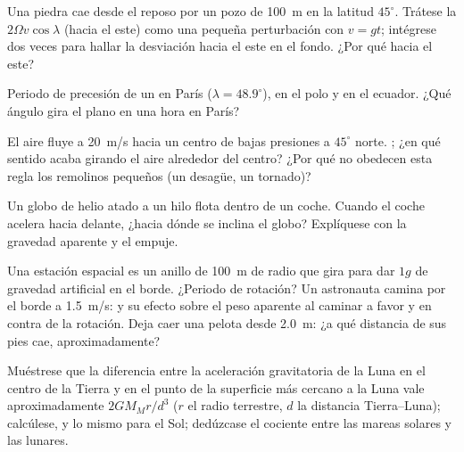 \begin{exercise}[$\star\star$]\label{exo:b1:non-inertial-frames:7}
Una piedra cae desde el reposo por un pozo de \qty{100}{m} en la latitud
$45^\circ$. Trátese la  $2\Omega v\cos\lambda$ (hacia
el este) como una pequeña perturbación con $v = gt$; intégrese dos veces
para hallar la desviación hacia el este en el fondo. ¿Por qué hacia el este?
\end{exercise}

\begin{exercise}[$\star\star$]\label{exo:b1:non-inertial-frames:8}
Periodo de precesión de un  en París ($\lambda = 48.9^\circ$),
en el polo y en el ecuador. ¿Qué ángulo gira el plano en una hora en París?
\end{exercise}

\begin{exercise}[$\star\star$]\label{exo:b1:non-inertial-frames:9}
El aire fluye a \qty{20}{m/s} hacia un centro de bajas presiones a
$45^\circ$ norte. ; ¿en qué sentido acaba girando
el aire alrededor del centro? ¿Por qué no obedecen esta regla los
remolinos pequeños (un desagüe, un tornado)?
\end{exercise}

\begin{exercise}[$\star\star\star$]\label{exo:b1:non-inertial-frames:10}
Un globo de helio atado a un hilo flota dentro de un coche. Cuando el
coche acelera hacia delante, ¿hacia dónde se inclina el globo?
Explíquese con la gravedad aparente y el empuje.
\end{exercise}

\begin{exercise}[$\star\star\star$]\label{exo:b1:non-inertial-frames:11}
Una estación espacial es un anillo de \qty{100}{m} de radio que gira para
dar $1g$ de gravedad artificial en el borde. ¿Periodo de rotación? Un
astronauta camina por el borde a \qty{1.5}{m/s}:  y
su efecto sobre el peso aparente al caminar a favor y en contra de la
rotación. Deja caer una pelota desde \qty{2.0}{m}: ¿a qué distancia de sus
pies cae, aproximadamente?
\end{exercise}

\begin{exercise}[$\star\star\star$]\label{exo:b1:non-inertial-frames:12}
Muéstrese que la diferencia entre la aceleración gravitatoria de la Luna
en el centro de la Tierra y en el punto de la superficie más cercano a la
Luna vale aproximadamente $2GM_Mr/d^3$ ($r$ el radio terrestre, $d$ la
distancia Tierra--Luna); calcúlese, y lo mismo para el Sol; dedúzcase el
cociente entre las mareas solares y las lunares.
\end{exercise}


